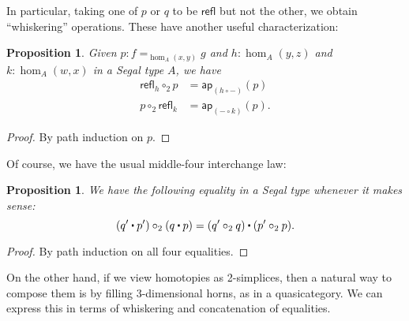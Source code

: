 \documentclass[12pt]{amsart}
\theoremstyle{plain}
\newtheorem{prop}[thm]{Proposition}
\theoremstyle{definition}
\theoremstyle{remark}
\numberwithin{equation}{section}
\newcommand{\refl}{\mathsf{refl}}
\newcommand{\ct}{%
  \mathchoice{\mathbin{\raisebox{0.5ex}{$\displaystyle\centerdot$}}}%
             {\mathbin{\raisebox{0.5ex}{$\centerdot$}}}%
             {\mathbin{\raisebox{0.25ex}{$\scriptstyle\,\centerdot\,$}}}%
             {\mathbin{\raisebox{0.1ex}{$\scriptscriptstyle\,\centerdot\,$}}}
}
\newcommand{\ap}{\mathsf{ap}}                             %
\begin{document}
In particular, taking one of $p$ or $q$ to be $\refl$ but not the other, we obtain ``whiskering'' operations.
These have another useful characterization:

\begin{prop}
  Given $p:f=_{\hom_A(x,y)} g$ and $h:\hom_A(y,z)$ and $k:\hom_A(w,x)$ in a Segal type $A$, we have
  \begin{align*}
    \refl_h \circ_2 p &= \ap_{(h\circ -)}(p)\\
    p \circ_2 \refl_k &= \ap_{(-\circ k)}(p).
  \end{align*}
\end{prop}
\begin{proof}
  By path induction on $p$.
\end{proof}

Of course, we have the usual middle-four interchange law:

\begin{prop}
  We have the following equality in a Segal type whenever it makes sense:
  \[ (q'\ct p') \circ_2 (q\ct p) = (q' \circ_2 q) \ct (p' \circ_2 p). \]
\end{prop}
\begin{proof}
  By path induction on all four equalities.
\end{proof}

On the other hand, if we view homotopies as 2-simplices, then a natural way to compose them is by filling 3-dimensional horns, as in a quasicategory.
We can express this in terms of whiskering and concatenation of equalities.
\end{document}
